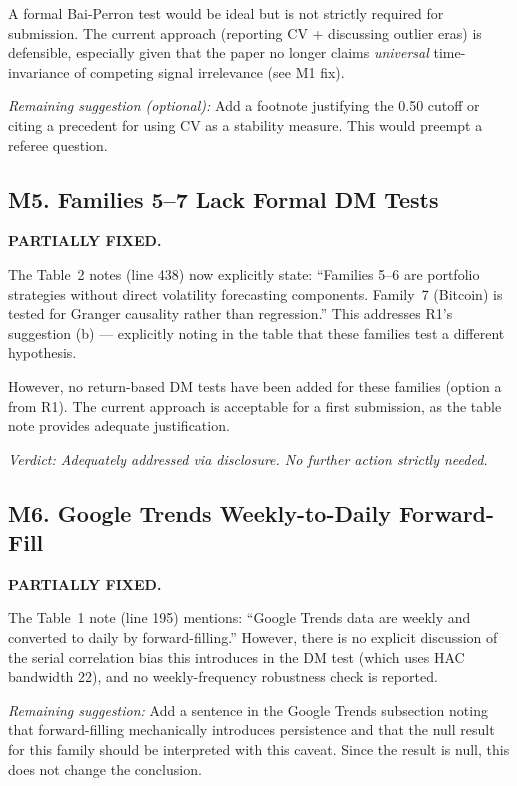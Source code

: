 \documentclass[12pt,a4paper]{article}
\begin{document}
A formal Bai-Perron test would be ideal but is not strictly required for submission. The current approach (reporting CV + discussing outlier eras) is defensible, especially given that the paper no longer claims \emph{universal} time-invariance of competing signal irrelevance (see M1 fix).

\textit{Remaining suggestion (optional):} Add a footnote justifying the 0.50 cutoff or citing a precedent for using CV as a stability measure. This would preempt a referee question.


\subsection*{M5. Families 5--7 Lack Formal DM Tests}
\textcolor{fixedblue}{\textbf{PARTIALLY FIXED.}}

The Table~2 notes (line 438) now explicitly state: ``Families 5--6 are portfolio strategies without direct volatility forecasting components. Family~7 (Bitcoin) is tested for Granger causality rather than regression.'' This addresses R1's suggestion (b) --- explicitly noting in the table that these families test a different hypothesis.

However, no return-based DM tests have been added for these families (option a from R1). The current approach is acceptable for a first submission, as the table note provides adequate justification.

\textit{Verdict: Adequately addressed via disclosure. No further action strictly needed.}


\subsection*{M6. Google Trends Weekly-to-Daily Forward-Fill}
\textcolor{warncolor}{\textbf{PARTIALLY FIXED.}}

The Table~1 note (line 195) mentions: ``Google Trends data are weekly and converted to daily by forward-filling.'' However, there is no explicit discussion of the serial correlation bias this introduces in the DM test (which uses HAC bandwidth 22), and no weekly-frequency robustness check is reported.

\textit{Remaining suggestion:} Add a sentence in the Google Trends subsection noting that forward-filling mechanically introduces persistence and that the null result for this family should be interpreted with this caveat. Since the result is null, this does not change the conclusion.
\end{document}

